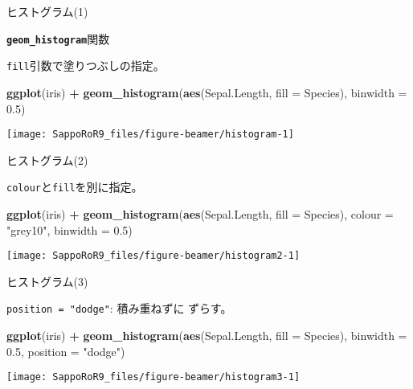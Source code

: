 \documentclass[ignorenonframetext,]{beamer}
\newenvironment{Shaded}{\begin{snugshade}}{\end{snugshade}}
\newcommand{\KeywordTok}[1]{\textcolor[rgb]{0.13,0.29,0.53}{\textbf{#1}}}
\newcommand{\DataTypeTok}[1]{\textcolor[rgb]{0.13,0.29,0.53}{#1}}
\newcommand{\FloatTok}[1]{\textcolor[rgb]{0.00,0.00,0.81}{#1}}
\newcommand{\StringTok}[1]{\textcolor[rgb]{0.31,0.60,0.02}{#1}}
\newcommand{\OperatorTok}[1]{\textcolor[rgb]{0.81,0.36,0.00}{\textbf{#1}}}
\newcommand{\NormalTok}[1]{#1}
\let\oldShaded\Shaded
\let\endoldShaded\endShaded
\renewenvironment{Shaded}{\footnotesize\oldShaded}{\endoldShaded}
\begin{document}
\begin{frame}[fragile]{ヒストグラム(1)}

\textbf{\texttt{geom\_histogram}}関数

\texttt{fill}引数で塗りつぶしの指定。

\begin{Shaded}
\begin{Highlighting}[]
\KeywordTok{ggplot}\NormalTok{(iris) }\OperatorTok{+}
\StringTok{  }\KeywordTok{geom_histogram}\NormalTok{(}\KeywordTok{aes}\NormalTok{(Sepal.Length, }\DataTypeTok{fill =}\NormalTok{ Species),}
                 \DataTypeTok{binwidth =} \FloatTok{0.5}\NormalTok{)}
\end{Highlighting}
\end{Shaded}

\texttt{[image: SappoRoR9\_files/figure-beamer/histogram-1]}

\end{frame}

\begin{frame}[fragile]{ヒストグラム(2)}

\texttt{colour}と\texttt{fill}を別に指定。

\begin{Shaded}
\begin{Highlighting}[]
\KeywordTok{ggplot}\NormalTok{(iris) }\OperatorTok{+}
\StringTok{  }\KeywordTok{geom_histogram}\NormalTok{(}\KeywordTok{aes}\NormalTok{(Sepal.Length, }\DataTypeTok{fill =}\NormalTok{ Species),}
                 \DataTypeTok{colour =} \StringTok{"grey10"}\NormalTok{, }\DataTypeTok{binwidth =} \FloatTok{0.5}\NormalTok{)}
\end{Highlighting}
\end{Shaded}

\texttt{[image: SappoRoR9\_files/figure-beamer/histogram2-1]}

\end{frame}

\begin{frame}[fragile]{ヒストグラム(3)}

\texttt{position\ =\ "dodge"}: 積み重ねずに ずらす。

\begin{Shaded}
\begin{Highlighting}[]
\KeywordTok{ggplot}\NormalTok{(iris) }\OperatorTok{+}
\StringTok{  }\KeywordTok{geom_histogram}\NormalTok{(}\KeywordTok{aes}\NormalTok{(Sepal.Length, }\DataTypeTok{fill =}\NormalTok{ Species),}
                 \DataTypeTok{binwidth =} \FloatTok{0.5}\NormalTok{, }\DataTypeTok{position =} \StringTok{"dodge"}\NormalTok{)}
\end{Highlighting}
\end{Shaded}

\texttt{[image: SappoRoR9\_files/figure-beamer/histogram3-1]}

\end{frame}
\end{document}
